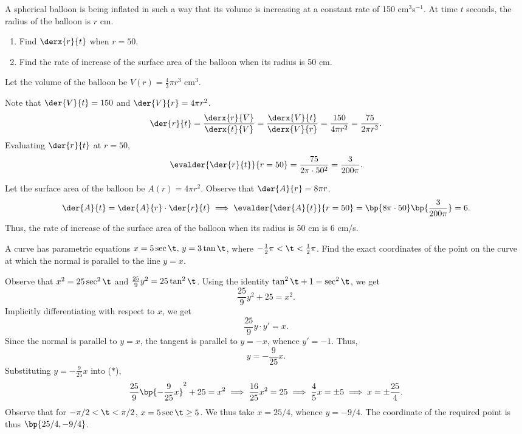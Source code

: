 \begin{problem}
    A spherical balloon is being inflated in such a way that its volume is increasing at a constant rate of 150 cm$^3$s$^{-1}$. At time $t$ seconds, the radius of the balloon is $r$ cm.

    \begin{enumerate}
        \item Find $\derx{r}{t}$ when $r = 50$.
        \item Find the rate of increase of the surface area of the balloon when its radius is 50 cm.
    \end{enumerate}
\end{problem}
\begin{solution}
    Let the volume of the balloon be $V(r) = \frac43 \pi r^3$ cm$^3$.

    \begin{ppart}
        Note that $\der{V}{t} = 150$ and $\der{V}{r} = 4\pi r^2$. \[\der{r}{t} = \frac{\derx{r}{V}}{\derx{t}{V}} = \frac{\derx{V}{t}}{\derx{V}{r}} = \frac{150}{4\pi r^2} = \frac{75}{2\pi r^2}.\] Evaluating $\der{r}{t}$ at $r=50$, \[\evalder{\der{r}{t}}{r=50} = \frac{75}{2 \pi \cdot 50^2} = \frac3{200\pi}.\]
    \end{ppart}
    \begin{ppart}
        Let the surface area of the balloon be $A(r) = 4\pi r^2$. Observe that $\der{A}{r} = 8 \pi r$. \[\der{A}{t} = \der{A}{r} \cdot \der{r}{t} \implies \evalder{\der{A}{t}}{r=50} = \bp{8\pi\cdot50}\bp{\frac3{200\pi}} = 6.\] Thus, the rate of increase of the surface area of the balloon when its radius is 50 cm is 6 cm/s.
    \end{ppart}
\end{solution}

\begin{problem}
    A curve has parametric equations $x = 5\sec\t, \, y = 3\tan\t$, where $-\frac12\pi < \t < \frac12\pi$. Find the exact coordinates of the point on the curve at which the normal is parallel to the line $y=x$.
\end{problem}
\begin{solution}
    Observe that $x^2 = 25\sec^2\t$ and $\frac{25}9 y^2 = 25\tan^2\t$. Using the identity $\tan^2\t + 1 = \sec^2\t$, we get \[\frac{25}9 y^2 + 25 = x^2. \tag{$\ast$}\] Implicitly differentiating with respect to $x$, we get \[\frac{25}9 y \cdot y' = x.\] Since the normal is parallel to $y =x$, the tangent is parallel to $y = -x$, whence $y' = -1$. Thus, \[y = -\frac9{25} x.\] Substituting $y = -\frac9{25}x$ into ($\ast$), \[\frac{25}9 \bp{-\frac9{25} x}^2 + 25 = x^2 \implies \frac{16}{25} x^2 = 25 \implies \frac45 x = \pm 5 \implies x = \pm \frac{25}4.\] Observe that for $-\pi/2 < \t < \pi/2$, $x=5\sec\t \geq 5$. We thus take $x=25/4$, whence $y = -9/4$. The coordinate of the required point is thus $\bp{25/4, -9/4}$.
\end{solution}


